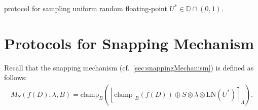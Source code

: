                   \begin{protocol}[tbh!]
                        \centering
                        \caption{\smpc protocol for sampling uniform random floating-point $U^{*}\in \mathbb{D} \cap \left(0,1\right) $.}
                        \label{prot:RandFloat1}
                  \end{protocol}
                  \FloatBarrier


                  \section{\smpc Protocols for Snapping Mechanism}
                  \label{sec:MPCProtocolsforSnappingMechanism}

                  Recall that the snapping mechanism (cf.~\autoref{sec:snappingMechanism}) is defined as follows:
                  \begin{equation}
                        \begin{split}
                              M_{S}\left(f\left(D\right),\lambda,B\right) =\text{clamp}_{B}\left(\left\lfloor\text {clamp }_{B}\left(f\left(D\right) \right) \oplus S\otimes \lambda\otimes \text{LN}\left(U^{*}\right) \right\rceil_{\Lambda}\right).
                        \end{split}
                  \end{equation}

